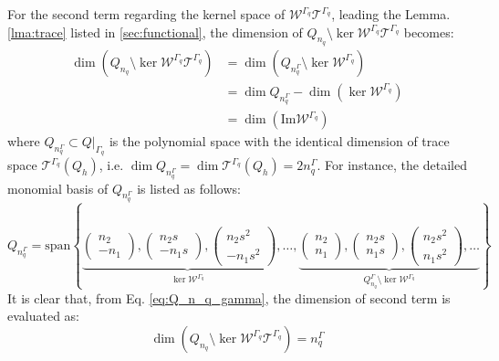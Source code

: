 For the second term regarding the kernel space of $\mathcal W^{\Gamma_q} \mathcal T^{\Gamma_q}$, leading the Lemma.\ref{lma:trace} listed in \ref{sec:functional}, the dimension of $Q_{n_q}\setminus\ker \mathcal W^{\Gamma_q}\mathcal T^{\Gamma_q}$ becomes:
\begin{equation}\label{eq:dim_relation_3_2_1}
    \begin{aligned}
        \dim\left(Q_{n_q}\setminus\ker \mathcal W^{\Gamma_q}\mathcal T^{\Gamma_q}\right)&=
        \dim\left(Q_{n_q^{\Gamma}}\setminus\ker \mathcal W^{\Gamma_q}\right) \\
        &= \dim Q_{n_q^{\Gamma}} - \dim\left(\ker \mathcal W^{\Gamma_q}\right) \\
        &= \dim(\mathrm{Im}\mathcal W^{\Gamma_q})
    \end{aligned}
\end{equation}
where $Q_{n_q^\Gamma}\subset Q\vert_{\Gamma_q}$ is the polynomial space with the identical dimension of trace space $\mathcal T^{\Gamma_q}(Q_h)$,
i.e. $\dim Q_{n_q^\Gamma} = \dim \mathcal T^{\Gamma_q}(Q_h) = 2n_q^\Gamma$.
For instance, the detailed monomial basis of $Q_{n_q^\Gamma}$ is listed as follows:
\begin{equation}\label{eq:Q_n_q_gamma}
    Q_{n_q^\Gamma} = \mathrm{span} \left \{
        \underbrace{
        \begin{pmatrix}
            n_2 \\ -n_1
        \end{pmatrix},
        \begin{pmatrix}
            n_2 s \\ -n_1 s
        \end{pmatrix},
        \begin{pmatrix}
            n_2 s^2 \\ -n_1 s^2
        \end{pmatrix},
        \dots}_{\ker \mathcal W^{\Gamma_q}},
        \underbrace{
        \begin{pmatrix}
            n_2 \\ n_1
        \end{pmatrix},
        \begin{pmatrix}
            n_2 s \\ n_1 s
        \end{pmatrix},
        \begin{pmatrix}
            n_2 s^2 \\ n_1 s^2
        \end{pmatrix},
        \dots}_{Q_{n_q}^\Gamma\setminus \ker \mathcal W^{\Gamma_q}}
    \right \}
\end{equation}
It is clear that, from Eq. \eqref{eq:Q_n_q_gamma}, the dimension of second term is evaluated as:
\begin{equation}\label{eq:dim_relation_3_2}
    \dim\left(Q_{n_q}\setminus\ker \mathcal W^{\Gamma_q}\mathcal T^{\Gamma_q}\right) = n_q^\Gamma
\end{equation}

